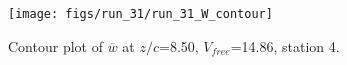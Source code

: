 \begin{figure}[H]
\centering
\texttt{[image: figs/run\_31/run\_31\_W\_contour]}
\caption{Contour plot of $\overline{w}$ at $z/c$=8.50, $V_{free}$=14.86, station 4.}
\label{fig:run_31_W_contour}
\end{figure}


